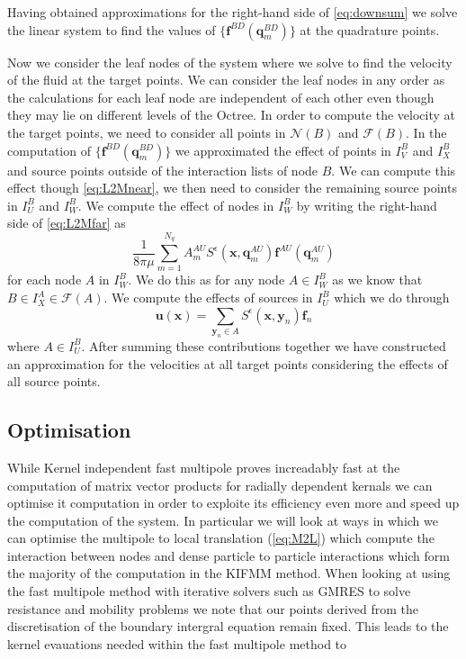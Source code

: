 Having obtained approximations for the right-hand side of \cref{eq:downsum} we solve the linear system to find the values of $\{\bm{f}^{BD}(\bm{q}^{BD}_m)\}$ at the quadrature points.

Now we consider the leaf nodes of the system where we solve to find the velocity of the fluid at the target points. We can consider the leaf nodes in any order as the calculations for each leaf node are independent of each other even though they may lie on different levels of the Octree. In order to compute the velocity at the target points, we need to consider all points in $\mathcal{N}(B)$ and $\mathcal{F}(B)$. In the computation of  $\{\bm{f}^{BD}(\bm{q}^{BD}_m)\}$ we approximated the effect of points in $I_V^B$ and $I_X^B$ and source points outside of the interaction lists of node $B$. We can compute this effect though \cref{eq:L2Mnear}, we then need to consider the remaining source points in $I_U^B$ and $I_W^B$. We compute the effect of nodes in $I_W^B$ by writing the right-hand side of \cref{eq:L2Mfar} as
\begin{equation*}
    \frac{1}{8 \pi \mu} \sum_{m=1}^{N_{q}} A_{m}^{AU} S^\epsilon\left(\bm{x}, \bm{q}_{m}^{A U}\right) \bm{f}^{A U}\left(\bm{q}_{m}^{A U}\right)
\end{equation*}
for each node $A$ in $I_W^B$. We do this as for any node $A \in I_W^B$ as we know that $B \in I_X^A \in \mathcal{F}(A)$. We compute the effects of sources in $I_U^B$ which we do through
\begin{equation}
\label{eq:U}
    \bm{u}(\bm{x}) = \sum_{{\bm{y}}_n\in A} S^\epsilon(\bm{x},{\bm{y}}_n){\bm{f}}_n
\end{equation}
where $A \in I_U^B$. After summing these contributions together we have constructed an approximation for the velocities at all target points considering the effects of all source points.

\subsection{Optimisation}
While Kernel independent fast multipole proves increadably fast at the computation of matrix vector products for radially dependent kernals we can optimise it computation in order to exploite its efficiency even more and speed up the computation of the system. In particular we will look at ways in which we can optimise the multipole to local translation (\cref{eq:M2L}) which compute the interaction between nodes and dense particle to particle interactions which form the majority of the computation in the KIFMM method. When looking at using the fast multipole method with iterative solvers such as GMRES to solve resistance and mobility problems we note that our points derived from the discretisation of the boundary intergral equation remain fixed. This leads to the kernel evauations needed within the fast multipole method to

